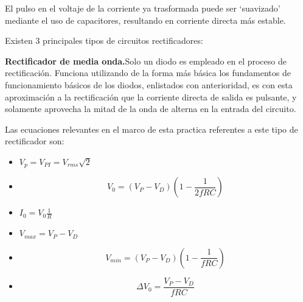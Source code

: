 \documentclass[12pt]{article}
\begin{document}
        El pulso en el voltaje de la corriente ya trasformada puede ser `suavizado' mediante el uso de
        capacitores, resultando en corriente directa más estable.\par
        Existen 3 principales tipos de circuitos rectificadores:\par
            \textbf{Rectificador de media onda.}Solo un diodo es empleado en el proceso de rectificación. Funciona utilizando de la forma más
            básica los fundamentos de funcionamiento básicos de los diodos, enlistados con anterioridad, es
            con esta aproximación a la rectificación que la corriente directa de salida es pulsante, y solamente
            aprovecha la mitad de la onda de alterna en la entrada del circuito.\par
            Las ecuaciones relevantes en el marco de esta practica referentes a este tipo de rectificador son:\par
            \begin{multicols}{2}
                \begin{itemize}
                    \item$V_p = V_{PI} = V_{rms}\sqrt{2}$
                    \item \begin{equation*}
                        V_0=(V_P-V_D)(1-\frac{1}{2fRC})
                    \end{equation*}
                    \item $I_0 = V_0 \frac{1}{R}$
                    \item $V_{max} = V_P - V_D$
                    \item \begin{equation*}
                        V_{min}=(V_P-V_D)(1-\frac{1}{fRC})
                    \end{equation*}
                    \item \begin{equation*}
                        \Delta  V_0 = \frac{V_P-V_D}{fRC}
                    \end{equation*}
                \end{itemize}
            \end{multicols}
\end{document}
